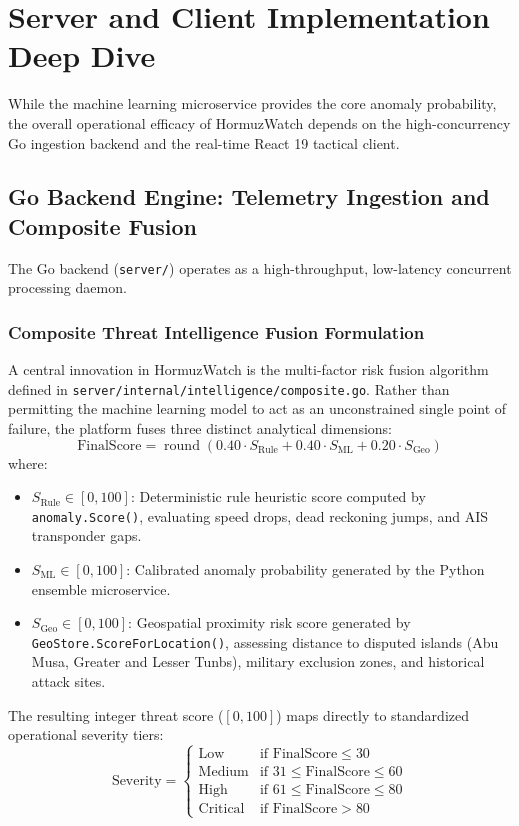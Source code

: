 \section{Server and Client Implementation Deep Dive}
\label{sec:server_client}

While the machine learning microservice provides the core anomaly probability, the overall operational efficacy of HormuzWatch depends on the high-concurrency Go ingestion backend and the real-time React 19 tactical client.

\subsection{Go Backend Engine: Telemetry Ingestion and Composite Fusion}
The Go backend (\texttt{server/}) operates as a high-throughput, low-latency concurrent processing daemon.

\subsubsection{Composite Threat Intelligence Fusion Formulation}
A central innovation in HormuzWatch is the multi-factor risk fusion algorithm defined in \texttt{server/internal/intelligence/composite.go}. Rather than permitting the machine learning model to act as an unconstrained single point of failure, the platform fuses three distinct analytical dimensions:
\begin{equation}
\text{FinalScore} = \operatorname{round}\left( 0.40 \cdot S_{\text{Rule}} + 0.40 \cdot S_{\text{ML}} + 0.20 \cdot S_{\text{Geo}} \right)
\end{equation}
where:
\begin{itemize}[leftmargin=*]
    \item $S_{\text{Rule}} \in [0, 100]$: Deterministic rule heuristic score computed by \texttt{anomaly.Score()}, evaluating speed drops, dead reckoning jumps, and AIS transponder gaps.
    \item $S_{\text{ML}} \in [0, 100]$: Calibrated anomaly probability generated by the Python ensemble microservice.
    \item $S_{\text{Geo}} \in [0, 100]$: Geospatial proximity risk score generated by \texttt{GeoStore.ScoreForLocation()}, assessing distance to disputed islands (Abu Musa, Greater and Lesser Tunbs), military exclusion zones, and historical attack sites.
\end{itemize}
The resulting integer threat score ($[0, 100]$) maps directly to standardized operational severity tiers:
\begin{equation}
\text{Severity} = 
\begin{cases}
\text{Low} & \text{if } \text{FinalScore} \le 30 \\
\text{Medium} & \text{if } 31 \le \text{FinalScore} \le 60 \\
\text{High} & \text{if } 61 \le \text{FinalScore} \le 80 \\
\text{Critical} & \text{if } \text{FinalScore} > 80
\end{cases}
\end{equation}


